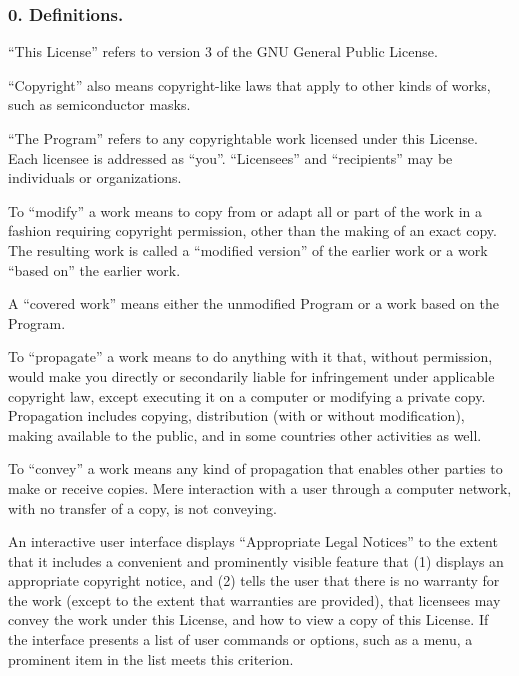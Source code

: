 \subsubsection{0. Definitions.}
“This License” refers to version 3 of the GNU General Public License.\par
“Copyright” also means copyright-like laws that apply to other kinds of works, such as semiconductor masks.\par
“The Program” refers to any copyrightable work licensed under this License. Each licensee is addressed as “you”. “Licensees” and “recipients” may be individuals or organizations.\par
To “modify” a work means to copy from or adapt all or part of the work in a fashion requiring copyright permission, other than the making of an exact copy. The resulting work is called a “modified version” of the earlier work or a work “based on” the earlier work.\par
A “covered work” means either the unmodified Program or a work based on the Program.\par
To “propagate” a work means to do anything with it that, without permission, would make you directly or secondarily liable for infringement under applicable copyright law, except executing it on a computer or modifying a private copy. Propagation includes copying, distribution (with or without modification), making available to the public, and in some countries other activities as well.\par
To “convey” a work means any kind of propagation that enables other parties to make or receive copies. Mere interaction with a user through a computer network, with no transfer of a copy, is not conveying.\par
An interactive user interface displays “Appropriate Legal Notices” to the extent that it includes a convenient and prominently visible feature that (1) displays an appropriate copyright notice, and (2) tells the user that there is no warranty for the work (except to the extent that warranties are provided), that licensees may convey the work under this License, and how to view a copy of this License. If the interface presents a list of user commands or options, such as a menu, a prominent item in the list meets this criterion.
